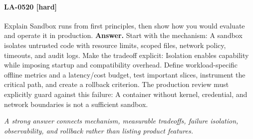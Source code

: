 \paragraph{LA-0520 [hard]} Explain Sandbox runs from first principles, then show how you would evaluate and operate it in production.
\noindent\textbf{Answer.} Start with the mechanism: A sandbox isolates untrusted code with resource limits, scoped files, network policy, timeouts, and audit logs. Make the tradeoff explicit: Isolation enables capability while imposing startup and compatibility overhead. Define workload-specific offline metrics and a latency/cost budget, test important slices, instrument the critical path, and create a rollback criterion. The production review must explicitly guard against this failure: A container without kernel, credential, and network boundaries is not a sufficient sandbox.
\par\textit{A strong answer connects mechanism, measurable tradeoffs, failure isolation, observability, and rollback rather than listing product features.}
